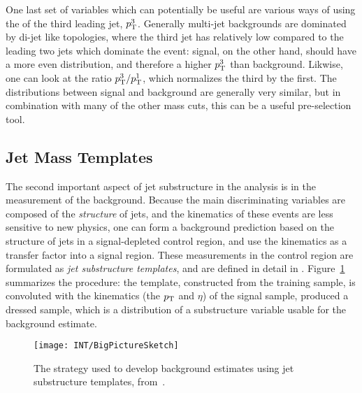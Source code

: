 One last set of variables which can potentially be useful are various ways of using the \pt of the third leading jet, $p_{\text{T}}^3$. Generally multi-jet backgrounds are dominated by di-jet like topologies, where the third jet has relatively low \pt compared to the leading two jets which dominate the event: signal, on the other hand, should have a more even \pt distribution, and therefore a higher $p_{\text{T}}^3$ than background. Likwise, one can look at the ratio $p_{\text{T}}^3/p_{\text{T}}^1$, which normalizes the third \pt by the first. The \pt distributions between signal and background are generally very similar, but in combination with many of the other mass cuts, this can be a useful pre-selection tool. 


\subsection{Jet Mass Templates}
	\label{chapter:search:substructure:templates}

The second important aspect of jet substructure in the analysis is in the measurement of the background. Because the main discriminating variables are composed of the \textit{structure} of jets, and the kinematics of these events are less sensitive to new physics, one can form a background prediction based on the structure of jets in a signal-depleted control region, and use the kinematics as a transfer factor into a signal region. These measurements in the control region are formulated as \textit{jet substructure templates}, and are defined in detail in \cite{MassTemplates}. Figure~\ref{fig:search:substructure:template-big-picture} summarizes the procedure: the template, constructed from the training sample, is convoluted with the kinematics (the $p_{\text{T}}$ and $\eta$) of the signal sample, produced a dressed sample, which is a distribution of a substructure variable usable for the background estimate.


\begin{figure}
\centering
\texttt{[image: INT/BigPictureSketch]}
\caption{The strategy used to develop background estimates using jet substructure templates, from~\cite{MassTemplates}.}
\label{fig:search:substructure:template-big-picture}
\end{figure}


